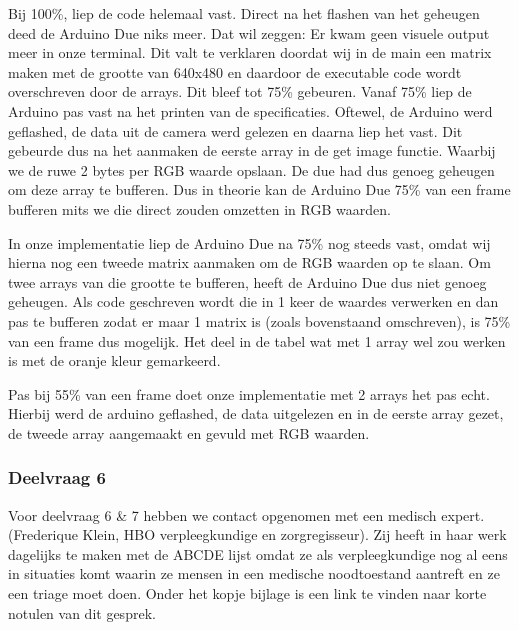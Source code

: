 \documentclass{article}
\begin{document}
Bij 100\%, liep de code helemaal vast. Direct na het flashen van het geheugen deed de Arduino Due niks meer. Dat wil zeggen: Er kwam geen visuele output meer in onze terminal. Dit valt te verklaren doordat wij in de main een matrix maken met de grootte van 640x480 en daardoor de executable code wordt overschreven door de arrays. 
Dit bleef tot 75\% gebeuren. Vanaf 75\% liep de Arduino pas vast na het printen van de specificaties. Oftewel, de Arduino werd geflashed, de data uit de camera werd gelezen en daarna liep het vast. Dit gebeurde dus na het aanmaken de eerste array in de get image functie. Waarbij we de ruwe 2 bytes per RGB waarde opslaan. De due had dus genoeg geheugen om deze array te bufferen. Dus in theorie kan de Arduino Due 75\% van een frame bufferen mits we die direct zouden omzetten in RGB waarden.

In onze implementatie liep de Arduino Due na 75\% nog steeds vast, omdat wij hierna nog een tweede matrix aanmaken om de RGB waarden op te slaan. Om twee arrays van die grootte te bufferen, heeft de Arduino Due dus niet genoeg geheugen. Als code geschreven wordt die in 1 keer de waardes verwerken en dan pas te bufferen zodat er maar 1 matrix is (zoals bovenstaand omschreven), is 75\% van een frame dus mogelijk. Het deel in de tabel wat met 1 array wel zou werken is met de oranje kleur gemarkeerd.

Pas bij 55\% van een frame doet onze implementatie met 2 arrays het pas echt. Hierbij werd de arduino geflashed, de data uitgelezen en in de eerste array gezet, de tweede array aangemaakt en gevuld met RGB waarden.

\subsubsection{Deelvraag 6}
Voor deelvraag 6 \& 7 hebben we contact opgenomen met een medisch expert. (Frederique Klein, HBO verpleegkundige en zorgregisseur). Zij heeft in haar werk dagelijks te maken met de ABCDE lijst omdat ze als verpleegkundige nog al eens in situaties komt waarin ze mensen in een medische noodtoestand aantreft en ze een triage moet doen. Onder het kopje bijlage is een link te vinden naar korte notulen van dit gesprek. 
\end{document}
